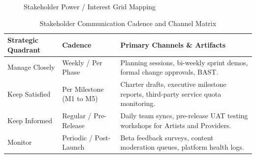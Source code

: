\documentclass[11pt,a4paper]{article}
\newcommand{\thdr}[1]{\centering\arraybackslash\textbf{#1}}
\begin{document}
\begin{figure}[H]
\caption{Stakeholder Power / Interest Grid Mapping}
\end{figure}

\begin{table}[H]
\centering
\caption{Stakeholder Communication Cadence and Channel Matrix}
\small
\begin{tabularx}{\textwidth}{| L{3.6cm} | L{3.0cm} | Y |}
\hline
{} \thdr{Strategic Quadrant} & \thdr{Cadence} & \thdr{Primary Channels \& Artifacts} \\
\hline
Manage Closely & Weekly / Per Phase & Planning sessions, bi-weekly sprint demos, formal change approvals, BAST. \\
\hline
Keep Satisfied & Per Milestone (M1 to M5) & Charter drafts, executive milestone reports, third-party service quota monitoring. \\
\hline
Keep Informed & Regular / Pre-Release & Daily team syncs, pre-release UAT testing workshops for Artists and Providers. \\
\hline
Monitor & Periodic / Post-Launch & Beta feedback surveys, content moderation queues, platform health logs. \\
\hline
\end{tabularx}
\end{table}

\clearpage

\end{document}
